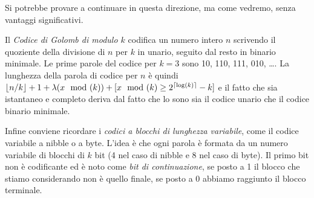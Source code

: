 Si potrebbe provare a continuare in questa direzione, ma come vedremo, senza vantaggi significativi.

Il \textit{Codice di Golomb di modulo $k$} \cite{golomb} codifica un numero intero $n$ scrivendo il quoziente della divisione di $n$ per $k$ in unario, seguito dal resto in binario minimale. Le prime parole del codice per $k = 3$ sono 10, 110, 111, 010, \dots. La lunghezza della parola di codice per $n$ è quindi $\left\lfloor n/k \right\rfloor + 1 + \lambda(x\mod(k)) + [x\mod(k) \geq 2^{\left\lceil \log(k) \right\rceil} - k]$ e il fatto che sia istantaneo e completo deriva dal fatto che lo sono sia il codice unario che il codice binario minimale.

Infine conviene ricordare i \textit{codici a blocchi di lunghezza variabile}, come il codice variabile a nibble o a byte. L'idea è che ogni parola è formata da un numero variabile di blocchi di $k$ bit (4 nel caso di nibble e 8 nel caso di byte). Il primo bit non è codificante ed è noto come \textit{bit di continuazione}, se posto a 1 il blocco che stiamo considerando non è quello finale, se posto a 0 abbiamo raggiunto il blocco terminale.

